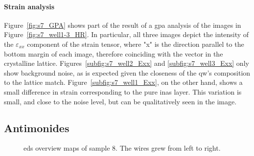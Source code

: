 \paragraph{Strain analysis} Figure~\ref{fig:s7_GPA} shows part of the result of a \acf{gpa} analysis of the images in Figure~\ref{fig:s7_well1-3_HR}. In particular, all three images depict the intensity of the $\varepsilon_{xx}$ component of the strain tensor, where "x" is the direction parallel to the bottom margin of each image, therefore coinciding with the  vector in the crystalline lattice. Figures~\ref{subfig:s7_well2_Exx} and \ref{subfig:s7_well3_Exx} only show background noise, as is expected given the closeness of the \acs{qw}'s composition to the lattice match. Figure~\ref{subfig:s7_well1_Exx}, on the other hand, shows a small difference in strain corresponding to the pure \acs{inas} layer. This variation is small, and close to the noise level, but can be qualitatively seen in the image.

\subsection{Antimonides}

\begin{figure}
    \centering
    \caption{\acs{eds} overview maps of sample 8. The wires grew from left to right.}
    \label{fig:s8_EDS_maps}
\end{figure}

